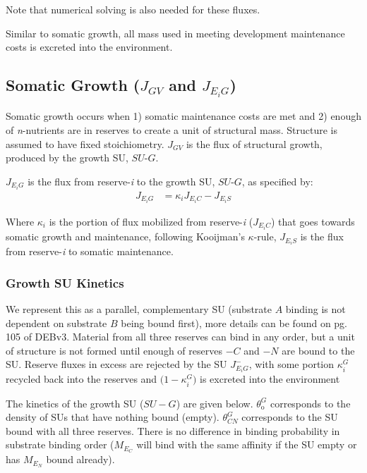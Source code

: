 \documentclass[
]{article}
\begin{document}
Note that numerical solving is also needed for these fluxes.

Similar to somatic growth, all mass used in meeting development
maintenance costs is excreted into the environment.

\newpage

\subsection{\texorpdfstring{Somatic Growth (\(J_{GV}\) and
\(J_{E_{i}G}\))}{Somatic Growth (J\_\{GV\} and J\_\{E\_\{i\}G\})}}\label{somatic-growth-j_gv-and-j_e_ig}

Somatic growth occurs when 1) somatic maintenance costs are met and 2)
enough of \emph{n}-nutrients are in reserves to create a unit of
structural mass. Structure is assumed to have fixed stoichiometry.
\(J_{GV}\) is the flux of structural growth, produced by the growth SU,
\(SU\)-\(G\).

\(J_{E_{i}G}\) is the flux from reserve-\emph{i} to the growth SU,
\(SU\)-\(G\), as specified by: \begin{align}
J_{E_{i}G} &= {\kappa_{i}} J_{E_{i}C}-J_{E_{i}S}
\end{align}

Where \({\kappa_{i}}\) is the portion of flux mobilized from
reserve-\emph{i} (\(J_{E_{i}C}\)) that goes towards somatic growth and
maintenance, following Kooijman's \(\kappa\)-rule, \(J_{E_{i}S}\) is the
flux from reserve-\emph{i} to somatic maintenance.

\subsubsection{Growth SU Kinetics}\label{growth-su-kinetics}

We represent this as a parallel, complementary SU (substrate \(A\)
binding is not dependent on substrate \(B\) being bound first), more
details can be found on pg. 105 of DEBv3. Material from all three
reserves can bind in any order, but a unit of structure is not formed
until enough of reserves \(-C\) and \(-N\) are bound to the SU. Reserve
fluxes in excess are rejected by the SU \(J_{E_{i}G}^{-}\), with some
portion \(\kappa_{i}^{G}\) recycled back into the reserves and
\(\biggl(1-\kappa_{i}^{G}\biggr)\) is excreted into the environment

The kinetics of the growth SU (\(SU-G\)) are given below.
\(\theta_{\text{o}}^G\) corresponds to the density of SUs that have
nothing bound (empty). \(\theta_{CN}^G\) corresponds to the SU bound
with all three reserves. There is no difference in binding probability
in substrate binding order (\(M_{E_C}\) will bind with the same affinity
if the SU empty or has \(M_{E_N}\) bound already).
\end{document}
